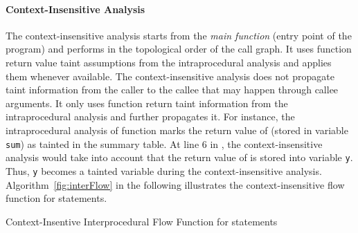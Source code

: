 \paragraph{Context-Insensitive Analysis}
The context-insensitive analysis starts from the \textit{main function}
(entry point of the program) and performs in the topological order
of the call graph. It uses function return value taint assumptions
from the intraprocedural analysis and applies them whenever available.
The context-insensitive analysis does not propagate taint information
from the caller to the callee that may happen through callee arguments.
It only uses function return taint information from the intraprocedural
analysis  and further propagates it.
For instance, the intraprocedural analysis of function \main{}
marks the return value of \compute (stored in variable \texttt{sum})
as tainted in the summary table. At line $6$ in \main, the context-insensitive
analysis  would take into account that the return value of \compute is
stored into variable \texttt{y}. Thus, \texttt{y} becomes a
tainted variable during the context-insensitive analysis.
Algorithm~\ref{fig:interFlow} in the following
illustrates the context-insensitive flow function for \callt statements.
\begin{algorithm}
\caption{Context-Insentive Interprocedural Flow Function for
\callt statements}\label{fig:interFlow}
\LinesNumbered
\DontPrintSemicolon
{}

\OutData{}
\end{algorithm}


